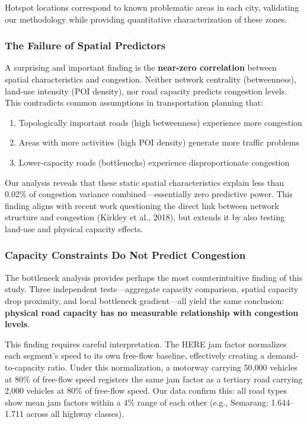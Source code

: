 \documentclass[12pt,a4paper]{article}
\begin{document}
Hotspot locations correspond to known problematic areas in each city, validating our methodology while providing quantitative characterization of these zones.

\subsubsection{The Failure of Spatial Predictors}

A surprising and important finding is the \textbf{near-zero correlation} between spatial characteristics and congestion. Neither network centrality (betweenness), land-use intensity (POI density), nor road capacity predicts congestion levels. This contradicts common assumptions in transportation planning that:

\begin{enumerate}
\def\labelenumi{\arabic{enumi}.}

\item
  Topologically important roads (high betweenness) experience more congestion
\item
  Areas with more activities (high POI density) generate more traffic problems
\item
  Lower-capacity roads (bottlenecks) experience disproportionate congestion
\end{enumerate}

Our analysis reveals that these static spatial characteristics explain less than 0.02\% of congestion variance combined---essentially zero predictive power. This finding aligns with recent work questioning the direct link between network structure and congestion (Kirkley et al., 2018), but extends it by also testing land-use and physical capacity effects.

\subsubsection{Capacity Constraints Do Not Predict Congestion}

The bottleneck analysis provides perhaps the most counterintuitive finding of this study. Three independent tests---aggregate capacity comparison, spatial capacity drop proximity, and local bottleneck gradient---all yield the same conclusion: \textbf{physical road capacity has no measurable relationship with congestion levels}.

This finding requires careful interpretation. The HERE jam factor normalizes each segment's speed to its own free-flow baseline, effectively creating a demand-to-capacity ratio. Under this normalization, a motorway carrying 50,000 vehicles at 80\% of free-flow speed registers the same jam factor as a tertiary road carrying 2,000 vehicles at 80\% of free-flow speed. Our data confirm this: all road types show mean jam factors within a 4\% range of each other (e.g., Semarang: 1.644--1.711 across all highway classes).
\end{document}
